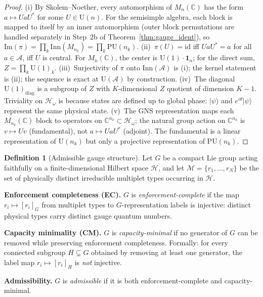 \documentclass[11pt,a4paper]{article}
\theoremstyle{definition}
\newtheorem{definition}[theorem]{Definition}
\begin{document}
\begin{proof}
(i) By Skolem--Noether, every automorphism of $M_n(\mathbb{C})$ has
the form $a \mapsto UaU^*$ for some $U \in \mathrm{U}(n)$.  For the
semisimple algebra, each block is mapped to itself by an inner
automorphism (outer block permutations are handled separately in
Step~2b of Theorem~\ref{thm:gauge_ident}), so
$\mathrm{Im}(\pi) = \prod_k \mathrm{Inn}(M_{n_k}) = \prod_k
\mathrm{PU}(n_k)$.  (ii)~$\pi(U) = \mathrm{id}$ iff
$UaU^* = a$ for all $a \in \mathcal{A}$, iff $U$ is central.
For $M_n(\mathbb{C})$, the center is $\mathrm{U}(1) \cdot
\mathbf{1}_n$; for the direct sum, $Z = \prod_k \mathrm{U}(1)_k$.
(iii)~Surjectivity of $\pi$ onto $\mathrm{Inn}(\mathcal{A})$ is (i);
the kernel statement is (ii); the sequence is exact at
$\mathrm{U}(\mathcal{A})$ by construction.  (iv)~The diagonal
$\mathrm{U}(1)_{\mathrm{diag}}$ is a subgroup of $Z$ with
$K$-dimensional $Z$ quotient of dimension $K - 1$.  Triviality on
$\mathcal{H}_\omega$ is because states are defined up to global
phase: $|\psi\rangle$ and $e^{i\theta}|\psi\rangle$ represent the
same physical state.  (v)~The GNS representation maps each
$M_{n_k}(\mathbb{C})$ block to operators on $\mathbb{C}^{n_k}
\subset \mathcal{H}_\omega$; the natural group action on
$\mathbb{C}^{n_k}$ is $v \mapsto Uv$ (fundamental), not
$a \mapsto UaU^*$ (adjoint).  The fundamental is a linear
representation of $\mathrm{U}(n_k)$ but only a projective
representation of $\mathrm{PU}(n_k)$.
\end{proof}

\begin{definition}[Admissible gauge structure]\label{def:admissible_gauge}
Let $G$ be a compact Lie group acting faithfully on a finite-dimensional
Hilbert space $\mathcal{H}$, and let $\mathcal{M} = \{r_1, \ldots, r_N\}$
be the set of physically distinct irreducible multiplet types occurring in
$\mathcal{H}$.

\smallskip\noindent\textbf{Enforcement completeness (EC).}\quad
$G$ is \emph{enforcement-complete} if the map
$r_i \mapsto [r_i]_G$ from multiplet types to $G$-representation labels
is injective: distinct physical types carry distinct gauge quantum numbers.

\smallskip\noindent\textbf{Capacity minimality (CM).}\quad
$G$ is \emph{capacity-minimal} if no generator of $G$ can be removed
while preserving enforcement completeness.  Formally: for every connected
subgroup $H \subsetneq G$ obtained by removing at least one generator,
the label map $r_i \mapsto [r_i]_H$ is \emph{not} injective.

\smallskip\noindent\textbf{Admissibility.}\quad
$G$ is \emph{admissible} if it is both enforcement-complete and
capacity-minimal.
\end{definition}
\end{document}
